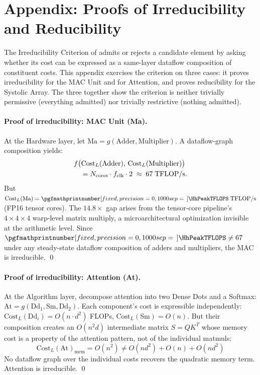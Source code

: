 \section*{Appendix: Proofs of Irreducibility and Reducibility}
\label{sec:appendix-proofs}

The Irreducibility Criterion of  admits or rejects a candidate element by asking whether its cost can be expressed as a same-layer dataflow composition of constituent costs. This appendix exercises the criterion on three cases: it proves irreducibility for the MAC Unit and for Attention, and proves reducibility for the Systolic Array. The three together show the criterion is neither trivially permissive (everything admitted) nor trivially restrictive (nothing admitted).

\paragraph{Proof of irreducibility: MAC Unit (Ma).} At the Hardware layer, let $\text{Ma} = g(\text{Adder}, \text{Multiplier})$. A dataflow-graph composition yields:
\begin{align}
\label{eq:mac-proof}
&f\bigl(\text{Cost}_L(\text{Adder}),\, \text{Cost}_L(\text{Multiplier})\bigr) \notag \\
&\quad = N_{\text{cores}} \cdot f_{\text{clk}} \cdot 2 \;\approx\; 67\;\text{TFLOP/s}.
\end{align}
But $\text{Cost}_L(\text{Ma}) = \cvalint{\HhPeakTFLOPS}\;\text{TFLOP/s}$ (FP16 tensor cores). The $14.8\times$ gap arises from the tensor-core pipeline's $4{\times}4{\times}4$ warp-level matrix multiply, a microarchitectural optimization invisible at the arithmetic level. Since $\cvalint{\HhPeakTFLOPS} \neq 67$ under any steady-state dataflow composition of adders and multipliers, the MAC is irreducible. \qed

\paragraph{Proof of irreducibility: Attention (At).} At the Algorithm layer, decompose attention into two Dense Dots and a Softmax: $\text{At} = g(\text{Dd}_1, \text{Sm}, \text{Dd}_2)$. Each component's cost is expressible independently: $\text{Cost}_L(\text{Dd}_i) = O(n \cdot d^2)$ FLOPs, $\text{Cost}_L(\text{Sm}) = O(n)$. But their composition creates an $O(n^2 d)$ intermediate matrix $S = QK^T$ whose memory cost is a property of the attention pattern, not of the individual matmuls:
\begin{equation}
\label{eq:attn-proof}
\text{Cost}_L(\text{At})_{\text{mem}} = O(n^2) \neq O(n d^2) + O(n) + O(n d^2)
\end{equation}
No dataflow graph over the individual costs recovers the quadratic memory term. Attention is irreducible. \qed

